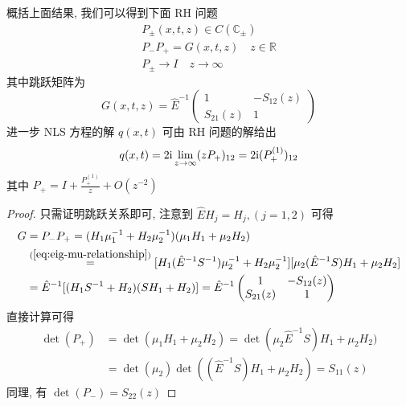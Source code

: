 \begin{definition}
  概括上面结果, 我们可以得到下面 RH 问题
  \begin{align}
    P_{\pm}(x,t,z) \in C(\mathbb{C}_{\pm})  \label{eq:RHP-1} \\
    P_{-}P_{+} = G(x,t,z) \quad z \in \mathbb{R} \label{eq:RHP-2}\\
    P_{\pm} \to I \quad z \to \infty \label{eq:RHP-3}
  \end{align}
  其中跳跃矩阵为
  \begin{equation}
    G(x,t,z) = \hat{E}^{-1} \begin{pmatrix}
      1 & -S_{12}(z) \\ S_{21}(z) & 1
    \end{pmatrix}
  \end{equation}
  进一步 NLS 方程的解 $ q(x,t) $ 可由 RH 问题的解给出
  \begin{equation}
    q(x,t) = 2 \mathrm{i} \lim_{z \to \infty} (z P_{+})_{12} = 2 \mathrm{i} (P_{+}^{(1)})_{12}
  \end{equation}
  其中 $ P_{+} = I + \frac{P_{+}^{(1)}}{z} + O(z^{-2}) $
\end{definition}
\begin{proof}
  只需证明跳跃关系即可, 注意到 $ \hat{E} H_{j} = H_{j}, (j=1,2) $ 可得 
  \begin{equation}
    \begin{aligned}
      G &= P_{-}P_{+} = (H_{1} \mu_{1}^{-1} + H_{2} \mu_{2}^{-1})(\mu_{1} H_{1} + \mu_{2} H_{2}) \\
        &\overset{(\ref{eq:eig-mu-relationship})}{=} [H_{1}(\hat{E}^{-1} S^{-1})\mu_{2}^{-1} + H_{2}\mu_{2}^{-1}]  [\mu_{2}(\hat{E}^{-1} S)H_{1} + \mu_{2}H_{2}] \\
        &= \hat{E}^{-1} [(H_{1}S^{-1} + H_2)(SH_{1} + H_{2})] = \hat{E}^{-1} \begin{pmatrix}
          1 & -S_{12}(z) \\ S_{21}(z) & 1
        \end{pmatrix}
    \end{aligned}
  \end{equation}
  直接计算可得
  \begin{equation}
    \begin{aligned}
    \det(P_{+}) &= \det(\mu_{1}H_{1} + \mu_{2} H_{2}) = \det(\mu_{2} \hat{E}^{-1} S) H_{1} + \mu_{2}H_{2}) \\
    &=\det(\mu_{2}) \det((\hat{E}^{-1} S) H_{1} + \mu_{2}H_{2}) = S_{11}(z)
    \end{aligned}
  \end{equation}
  同理, 有 $ \det(P_{-}) = S_{22}(z) $
\end{proof}

